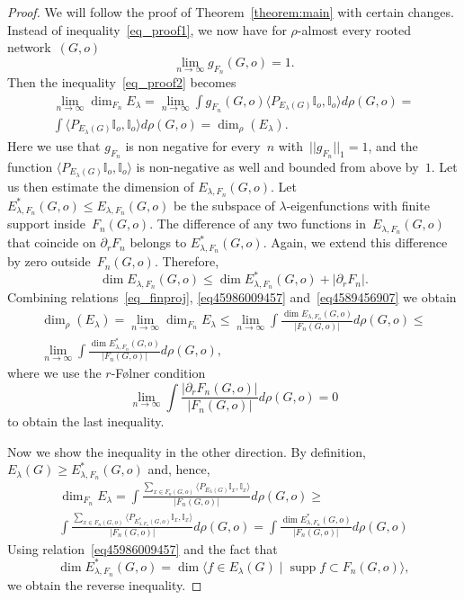 \documentclass[10pt,a4paper]{amsart}
\DeclareMathOperator{\supp}{supp}%
\begin{document}
\begin{proof}
    We will follow the proof of Theorem~\ref{theorem:main} with certain changes. Instead of inequality~\eqref{eq_proof1}, we now have for $\rho$-almost every rooted network~$(G,o)$
    $$
    \lim_{n \to \infty} g_{F_n}(G,o) = 1.
    $$
    Then the inequality~\eqref{eq_proof2} becomes
    \begin{multline}\label{eq45986009457}
        \lim_{n\to \infty} \dim_{F_n} E_\lambda = 
         \lim_{n\to \infty} \int g_{F_n}(G,o)\langle P_{E_\lambda(G)}\mathbb I_o, \mathbb I_o\rangle d \rho(G,o) = \\
        \int \langle P_{E_\lambda(G)}\mathbb I_o, \mathbb I_o\rangle d \rho(G,o) = 
    \dim_\rho (E_\lambda).
    \end{multline}
    Here we use that $g_{F_n}$ is non negative for every~$n$ with~$||g_{F_n}||_{1} =1$, and the function $\langle P_{E_\lambda(G)}\mathbb I_o, \mathbb I_o\rangle$ is non-negative as well and bounded from above by~$1$. 
    Let us then estimate the dimension of $E_{\lambda,F_n}(G,o)$. Let $E_{\lambda, F_n}^*(G,o) \le E_{\lambda,F_n}(G,o)$ be the subspace of $\lambda$-eigenfunctions with finite support inside~$F_n(G,o)$. The difference of any two functions in~$E_{\lambda,F_n}(G,o)$ that coincide on $\partial_r F_n$ belongs to $E_{\lambda, F_n}^*(G,o)$. Again, we extend this difference by zero outside~$F_n(G,o)$. Therefore, 
    \begin{equation}\label{eq4589456907}
        \dim E_{\lambda,F_n}(G,o) \le \dim
     E_{\lambda, F_n}^*(G,o) + |\partial_r F_n|.
    \end{equation}
    Combining relations~\eqref{eq_finproj}, \eqref{eq45986009457} and~\eqref{eq4589456907} we obtain 
    \begin{multline}
        \dim_\rho(E_\lambda) = 
        \lim_{n\to \infty} \dim_{F_n} E_\lambda \le 
        \lim_{n\to \infty} \int \frac{\dim {E_{\lambda,F_n}}(G,o)}{|F_n(G,o)|} d \rho (G,o) \le \\
        \lim_{n\to \infty} \int \frac{ \dim  E_{\lambda, F_n}^*(G,o)}{|F_n(G,o)|} d\rho(G,o), 
    \end{multline}
    where we use the $r$-F\o lner condition 
    $$
    \lim_{n\to\infty} \int \frac{|\partial_r F_n(G,o)|}{|F_n(G,o)|} d\rho(G,o) = 0
    $$
    to obtain the last inequality.
    
    Now we show the inequality in the other direction. By definition, $  E_\lambda(G) \ge E_{\lambda, F_n}^*(G,o)$ and, hence,
    \begin{multline}
        \dim_{F_n} E_\lambda = 
        \int \frac{\sum_{x \in F_n(G,o)}\langle P_{E_\lambda(G)} \mathbb{I}_x,\mathbb{I}_x \rangle}{|F_n(G,o)|}d\rho(G,o) \ge \\
        \int \frac{\sum_{x \in F_n(G,o)}\langle P_{E^*_{\lambda, F_n}(G,o)} \mathbb{I}_x,\mathbb{I}_x \rangle}{|F_n(G,o)|}d\rho(G,o) =
        \int \frac{\dim E^*_{\lambda, F_n}(G,o) }{|F_n(G,o)|}d\rho(G,o)
    \end{multline}
    Using relation~\eqref{eq45986009457} and the fact that 
    $$
    \dim E_{\lambda, F_n}^*(G,o) = \dim
    \langle f \in E_\lambda(G) \mid \supp f \subset F_n(G,o)\rangle, 
    $$
    we obtain the reverse inequality. 
\end{proof}
\end{document}
